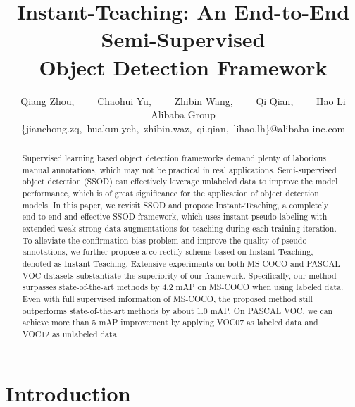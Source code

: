 \documentclass[final]{cvpr}
\begin{document}
\title{Instant-Teaching: An End-to-End Semi-Supervised \\ 
Object Detection Framework}

\newcommand*{\affmark}[1][*]{\textsuperscript{#1}}
\author{Qiang Zhou\affmark[],~~~~ Chaohui Yu\affmark[],~~~~ Zhibin Wang\affmark[],~~~~ Qi Qian\affmark[],~~~~ Hao Li\affmark[]\\
Alibaba Group\\
\{jianchong.zq,~huakun.ych,~zhibin.waz,~qi.qian,~lihao.lh\}@alibaba-inc.com\\
}



\maketitle

\pagestyle{empty}
\thispagestyle{empty}

\begin{abstract}

Supervised learning based object detection frameworks demand plenty of laborious manual annotations, which may not be practical in real applications. Semi-supervised object detection (SSOD) can effectively leverage unlabeled data to improve the model performance, which is of great significance for the application of object detection models. In this paper, we revisit SSOD and propose Instant-Teaching, a 
completely end-to-end and effective SSOD framework, which uses instant pseudo labeling with extended weak-strong data augmentations for teaching during each training iteration. To alleviate the confirmation bias problem and improve the quality of pseudo annotations, we further propose a co-rectify scheme based on Instant-Teaching, denoted as Instant-Teaching.
Extensive experiments on both MS-COCO and PASCAL VOC datasets substantiate the superiority of our framework.
Specifically, our method surpasses state-of-the-art methods by 4.2 mAP on MS-COCO when using  labeled data. Even with full supervised information of MS-COCO, the proposed method still outperforms state-of-the-art methods by about 1.0 mAP. On PASCAL VOC, we can achieve more than 5 mAP improvement by applying VOC07 as labeled data and VOC12 as unlabeled data.

\end{abstract}








\section{Introduction}
\end{document}

